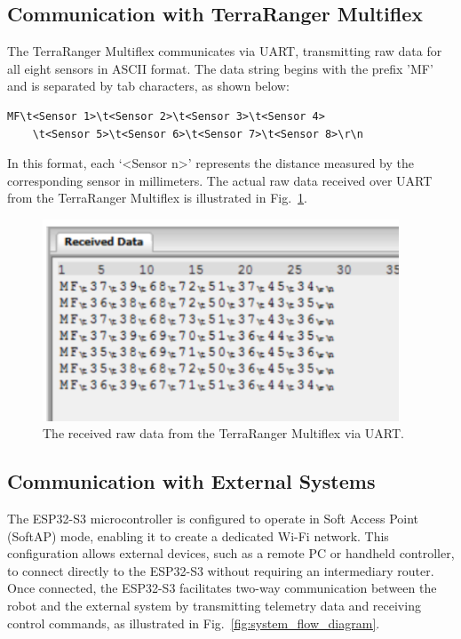 \subsection{Communication with TerraRanger Multiflex}
The TerraRanger Multiflex communicates via UART, transmitting raw data for all eight sensors in ASCII format. The data string begins with the prefix 'MF' and is separated by tab characters, as shown below:

\begin{lstlisting}[]
	MF\t<Sensor 1>\t<Sensor 2>\t<Sensor 3>\t<Sensor 4>
	\t<Sensor 5>\t<Sensor 6>\t<Sensor 7>\t<Sensor 8>\r\n
\end{lstlisting}

In this format, each `<Sensor n>' represents the distance measured by the corresponding sensor in millimeters. The actual raw data received over UART from the TerraRanger Multiflex is illustrated in Fig.~\ref{fig:terra_received_data}.
\begin{figure}[H]
	\centering
	\includegraphics[height=6cm]{assets/terra_received_data.png}
	\caption{The received raw data from the TerraRanger Multiflex via UART.}
	\label{fig:terra_received_data}
\end{figure}

\subsection{Communication with External Systems}

The ESP32-S3 microcontroller is configured to operate in Soft Access Point (SoftAP) mode, enabling it to create a dedicated Wi-Fi network. This configuration allows external devices, such as a remote PC or handheld controller, to connect directly to the ESP32-S3 without requiring an intermediary router. Once connected, the ESP32-S3 facilitates two-way communication between the robot and the external system by transmitting telemetry data and receiving control commands, as illustrated in Fig.~\ref{fig:system_flow_diagram}.


